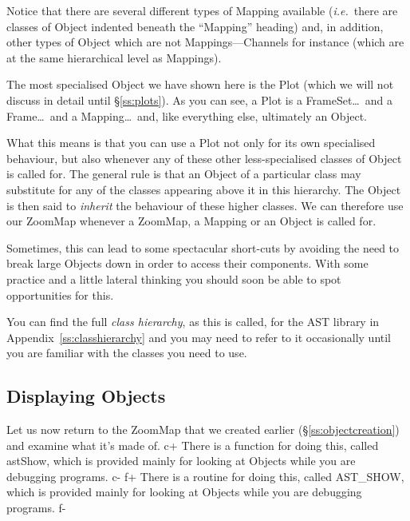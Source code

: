 \documentclass[twoside,11pt]{article}
\newcommand{\appref}[1]{Appendix~\ref{#1}}
\newcommand{\secref}[1]{\S\ref{#1}}
\newcommand{\appref}[1]{\ref{#1}}
\newcommand{\secref}[1]{\ref{#1}}
\begin{document}
Notice that there are several different types of Mapping available
({\em{i.e.}}\ there are classes of Object indented beneath the
``Mapping'' heading) and, in addition, other types of Object which are
not Mappings---Channels for instance (which are at the same
hierarchical level as Mappings).

The most specialised Object we have shown here is the Plot (which we
will not discuss in detail until \secref{ss:plots}). As you can see, a
Plot is a FrameSet\ldots\ and a Frame\ldots\ and a Mapping\ldots\ and,
like everything else, ultimately an Object.

What this means is that you can use a Plot not only for its own
specialised behaviour, but also whenever any of these other
less-specialised classes of Object is called for. The general rule is
that an Object of a particular class may substitute for any of the
classes appearing above it in this hierarchy. The Object is then said
to {\em{inherit}} the behaviour of these higher classes. We can
therefore use our ZoomMap whenever a ZoomMap, a Mapping or an Object
is called for.

Sometimes, this can lead to some spectacular short-cuts by avoiding
the need to break large Objects down in order to access their
components. With some practice and a little lateral thinking you
should soon be able to spot opportunities for this.

You can find the full {\em{class hierarchy}}, as this is called, for
the AST library in \appref{ss:classhierarchy} and you may need to
refer to it occasionally until you are familiar with the classes you
need to use.

\subsection{\label{ss:displayingobjects}Displaying Objects}

Let us now return to the ZoomMap that we created earlier
(\secref{ss:objectcreation}) and examine what it's made of.
c+
There is a function for doing this, called astShow, which is provided
mainly for looking at Objects while you are debugging programs.
c-
f+
There is a routine for doing this, called AST\_SHOW, which is provided
mainly for looking at Objects while you are debugging programs.
f-
\end{document}

